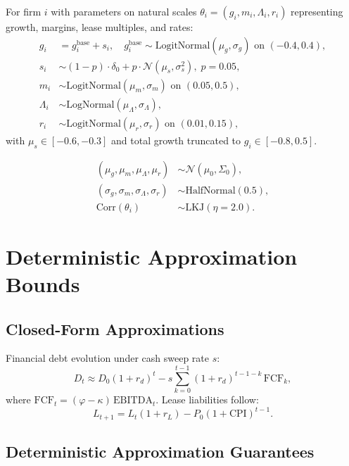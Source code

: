 \documentclass[11pt,a4paper]{article}
\newcommand{\EBITDA}{\mathrm{EBITDA}}
\newcommand{\CPI}{\mathrm{CPI}}
\newcommand{\FCF}{\mathrm{FCF}}
\theoremstyle{plain}
\theoremstyle{definition}
\begin{document}
For firm $i$ with parameters on natural scales $\theta_i = (g_i, m_i, \Lambda_i, r_i)$ representing growth, margins, lease multiples, and rates:
\begin{align}
 g_i &= g^{\text{base}}_i + s_i, \quad g^{\text{base}}_i \sim \text{LogitNormal}(\mu_g,\sigma_g) \text{ on } (-0.4,0.4), \\
 s_i &\sim (1-p)\cdot \delta_0 + p\cdot \mathcal{N}(\mu_s,\sigma_s^2),\; p=0.05, \\
 m_i &\sim \text{LogitNormal}(\mu_m,\sigma_m) \text{ on } (0.05,0.5), \\
 \Lambda_i &\sim \text{LogNormal}(\mu_\Lambda,\sigma_\Lambda), \\
 r_i &\sim \text{LogitNormal}(\mu_r,\sigma_r) \text{ on } (0.01,0.15),
\end{align}
with $\mu_s\in[-0.6,-0.3]$ and total growth truncated to $g_i\in[-0.8,0.5]$.

\begin{align}
(\mu_g,\mu_m,\mu_\Lambda,\mu_r) &\sim \mathcal{N}(\mu_0,\Sigma_0), \\
(\sigma_g,\sigma_m,\sigma_\Lambda,\sigma_r) &\sim \text{HalfNormal}(0.5), \\
\text{Corr}(\theta_i) &\sim \text{LKJ}(\eta=2.0).
\end{align}

\section{Deterministic Approximation Bounds}

\subsection{Closed-Form Approximations}

Financial debt evolution under cash sweep rate $s$:
\begin{equation}
D_t \approx D_0(1+r_d)^t - s \sum_{k=0}^{t-1} (1+r_d)^{t-1-k}\,\FCF_k,
\end{equation}
where $\FCF_t = (\varphi-\kappa)\,\EBITDA_t$. Lease liabilities follow:
\begin{equation}
L_{t+1} = L_t(1+r_L) - P_0(1+\CPI)^{t-1}.
\end{equation}

\subsection{Deterministic Approximation Guarantees}
\end{document}
